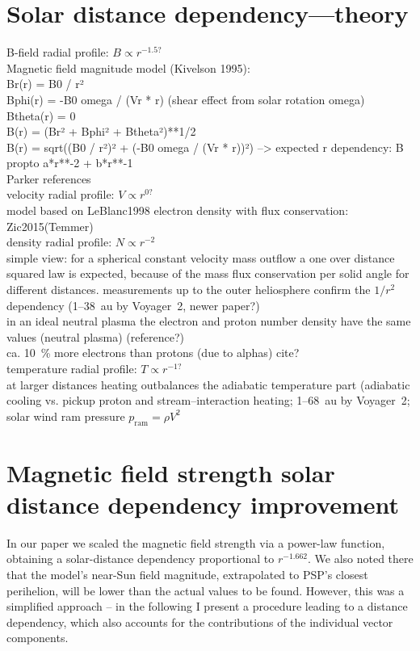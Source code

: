 \section{Solar distance dependency---theory}
B-field radial profile: $B \propto r^{-1.5?}$\\
	Magnetic field magnitude model (Kivelson 1995):\\
	Br(r) = B0 / r²\\
	Bphi(r) = -B0 omega / (Vr * r) (shear effect from solar rotation omega)\\
	Btheta(r) = 0\\
	B(r) = (Br² + Bphi² + Btheta²)**1/2\\
	B(r) = sqrt((B0 / r²)² + (-B0 omega / (Vr * r))²)	--> expected r dependency: B propto a*r**-2 + b*r**-1\\
	Parker references\\
velocity radial profile: $V \propto r^{0?}$\\
	model based on LeBlanc1998 electron density with flux conservation: Zic2015(Temmer)\\
density radial profile: $N \propto r^{-2}$\\
	simple view: for a spherical constant velocity mass outflow a one over distance squared law is expected, because of the mass flux conservation per solid angle for different distances. measurements up to the outer heliosphere confirm the $1/r^2$ dependency (1--38~au by Voyager~2, \citep{Belcher1993} newer paper?)\\

	in an ideal neutral plasma the electron and proton number density have the same values (neutral plasma) (reference?)\\
	ca. 10~\% more electrons than protons (due to alphas) cite?\\	%
temperature radial profile: $T \propto r^{-1?}$\\
	at larger distances heating outbalances the adiabatic temperature part (adiabatic cooling vs. pickup proton and stream--interaction heating; 1--68~au by Voyager~2; \citet{Richardson2003}\\
solar wind ram pressure $p_\text{ram} = \rho V^2$\\


\section{Magnetic field strength solar distance dependency improvement}
In our paper we scaled the magnetic field strength via a power-law function, obtaining a solar-distance dependency proportional to $r^{-1.662}$. We also noted there that the model's near-Sun field magnitude, extrapolated to PSP's closest perihelion, will be lower than the actual values to be found. However, this was a simplified approach -- in the following I present a procedure leading to a distance dependency, which also accounts for the contributions of the individual vector components.\\

